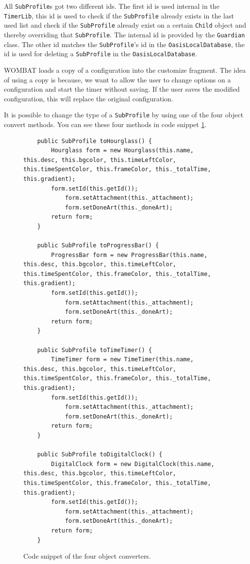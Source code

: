 \begin{description}
	All \texttt{SubProfile}s got two different ids. The first id is used internal in the \texttt{TimerLib}, this id is used to check if the \texttt{SubProfile} already exists in the last used list and check if the \texttt{SubProfile} already exist on a certain \texttt{Child} object and thereby overriding that \texttt{SubProfile}. The internal id is provided by the \texttt{Guardian} class. The other id matches the \texttt{SubProfile}'s id in the \texttt{OasisLocalDatabase}, the id is used for deleting a \texttt{SubProfile} in the \texttt{OasisLocalDatabase}.
	
	WOMBAT loads a copy of a configuration into the customize fragment. The idea of using a copy is because, we want to allow the user to change options on a configuration and start the timer without saving. If the user saves the modified configuration, this will replace the original configuration.
	
	It is possible to change the type of a \texttt{SubProfile} by using one of the four object convert methods. You can see these four methods in code snippet \ref{code:convert}.
	
	\begin{figure}[H]
\begin{lstlisting}
	public SubProfile toHourglass() {
		Hourglass form = new Hourglass(this.name, this.desc, this.bgcolor, this.timeLeftColor, this.timeSpentColor, this.frameColor, this._totalTime, this.gradient);
		form.setId(this.getId());		
			form.setAttachment(this._attachment);
			form.setDoneArt(this._doneArt);
		return form;
	}

	public SubProfile toProgressBar() {
		ProgressBar form = new ProgressBar(this.name, this.desc, this.bgcolor, this.timeLeftColor, this.timeSpentColor, this.frameColor, this._totalTime, this.gradient);
		form.setId(this.getId());
			form.setAttachment(this._attachment);
			form.setDoneArt(this._doneArt);
		return form;
	}

	public SubProfile toTimeTimer() {
		TimeTimer form = new TimeTimer(this.name, this.desc, this.bgcolor, this.timeLeftColor, this.timeSpentColor, this.frameColor, this._totalTime, this.gradient);
		form.setId(this.getId());
			form.setAttachment(this._attachment);
			form.setDoneArt(this._doneArt);
		return form;
	}

	public SubProfile toDigitalClock() {
		DigitalClock form = new DigitalClock(this.name, this.desc, this.bgcolor, this.timeLeftColor, this.timeSpentColor, this.frameColor, this._totalTime, this.gradient);
		form.setId(this.getId());
			form.setAttachment(this._attachment);
			form.setDoneArt(this._doneArt);
		return form;
	}
\end{lstlisting}
\caption{Code snippet of the four object converters.}%
\label{code:convert}%
\end{figure}
	

\end{description}
